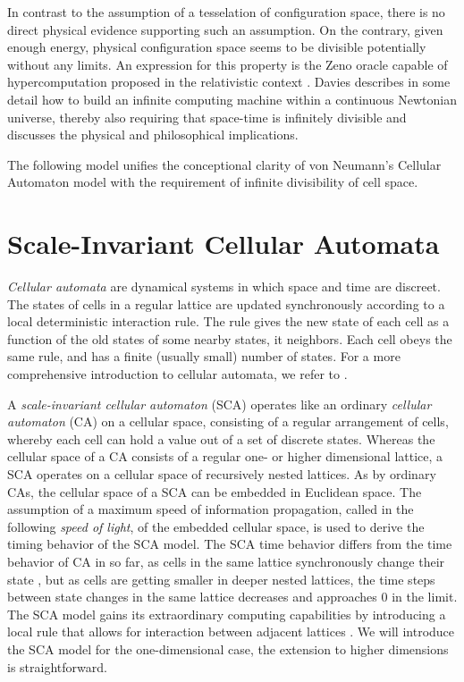 \documentclass[pre,amssymb,showpacs,showkeys,preprint]{revtex4}
\begin{document}
In contrast to the assumption of a tesselation of
configuration space, there is no direct
physical evidence supporting such an assumption.
On the contrary, given enough energy, physical configuration space seems
to be divisible potentially without any limits.
An expression for this property is the Zeno
oracle \cite{weyl:49} capable of hypercomputation
proposed
in the relativistic context
\cite{thom:54,benna:62,pit:90,ear-nor:93,hogarth1,hogarth2,beth-59,le-91}.
Davies \cite{davies-01} describes in some detail how to build an infinite computing machine within
a continuous Newtonian universe, thereby also requiring that space-time is infinitely divisible and
discusses the physical and philosophical
implications.

The following model unifies the conceptional clarity of
von Neumann's Cellular Automaton model with the
requirement of infinite divisibility of cell space.

\section{Scale-Invariant Cellular Automata}

\emph{Cellular automata} are dynamical systems in which space and time are discreet.
The states of cells in a regular lattice are updated synchronously according to a local deterministic
interaction rule.
The rule gives the new state of each cell as a function of the old states of some nearby states,
it neighbors.
Each cell obeys the same rule, and has a finite (usually small) number of states.
For a more comprehensive introduction to cellular automata, we refer to
\cite{wolfram-86, gutowitz, ilachinski01}.

A \emph{scale-invariant cellular automaton} (SCA) operates like an ordinary
\emph{cellular automaton} (CA) on a cellular space, consisting of a regular arrangement of cells,
whereby each cell can hold a value out of a set of discrete states.
Whereas the cellular space of a CA consists of a regular one- or higher
dimensional lattice, a SCA operates on a cellular space of recursively nested lattices.
As by ordinary CAs, the cellular space of a SCA can be embedded in Euclidean space.
The assumption of a maximum speed of information propagation,
called in the following \emph{speed of light}, of the embedded cellular space, is used to derive the
timing behavior of the SCA model.
The SCA time behavior differs from the time behavior of CA in so far,
as cells in the same lattice synchronously change their state \cite{Morelli_Zanette}, but
as cells are getting smaller in deeper nested lattices, the time steps between state changes in
the same lattice decreases and approaches 0 in the limit.
The SCA model gains its extraordinary computing capabilities by introducing a local rule that
allows for interaction between adjacent lattices \cite{BoFeng_MengDing}.
We will introduce the SCA model for the one-dimensional case, the extension to higher dimensions
\cite{Brunnet_Chate} is
straightforward.
\end{document}
